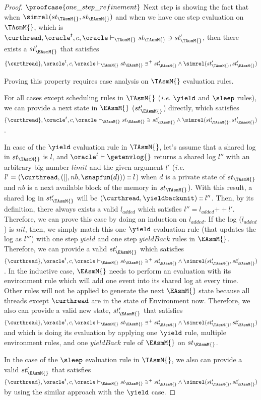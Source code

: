 \begin{proof}
$\proofcase{one\_step\_refinement}$
Next step is showing the fact that when $\simrel(st_{\TAsmM{}}, st_{\EAsmM{}})$ and 
when we have one step evaluation on $\TAsmM{}$, 
which is $\curthread, \oracle^{t}, c, \oracle \vdash_{\TAsmM{}} st_{\TAsmM{}} \ni st'_{\TAsmM{}} $, 
then there exists a $st'_{\EAsmM{}}$ that satisfies 
$$\{\curthread\}, \oracle^{t}, c, \oracle \vdash_{\TAsmM{}} st_{\EAsmM{}} \ni^{+} st'_{\EAsmM{}} \wedge \simrel(st'_{\TAsmM{}}, st'_{\EAsmM{}})$$

Proving this property requires case analysis on $\TAsmM{}$ evaluation rules.

For all cases except scheduling rules in $\TAsmM{}$ (\textit{i.e.} $\yield$ and $\sleep$ rules), 
we can provide a next state in $\EAsmM{}$ ($st'_{\EAsmM{}}$) directly, which satisfies $\{\curthread\}, \oracle^{t}, c,\oracle \vdash_{\EAsmM{}} st_{\EAsmM{}} \ni st'_{\EAsmM{}} \wedge \simrel(st'_{\TAsmM{}}, st'_{\EAsmM{}})$.

In case of the $\yield$ evaluation rule in $\TAsmM{}$, let's assume that 
a shared log in $st_{\TAsmM{}}$ is $l$, and $\oracle^{t} \vdash \getenvlog{}$ returns a shared log $l''$ with an arbitrary big number $limit$ and the 
given argument $l'$ (\textit{i.e.} $l' = (\curthread , ([], nb, \snapfun(d)))::l$) when $d$ is a 
private state of $st_{\TAsmM{}}$ and $nb$ is a next available block of the memory in $st_{\TAsmM{}}$). 
With this result, a shared log in $st'_{\TAsmM{}}$ will be $(\curthread , \yieldbackunit)::l''$.
Then, by its definition, there always exists a valid $l_{added}$ which satisfies $l'' = l_{added} {+\!\!+} l'$.
Therefore, we can prove this case by doing an induction on $l_{added}$. 
If the log ($l_{added}$) is $nil$, then, we simply match this one $\yield$ evaluation rule 
(that updates the log as $l'''$) with one step $yield$ and one step $yieldBack$ rules in $\EAsmM{}$.
Therefore, we can provide a valid $st'_{\EAsmM{}}$ 
which satisfies $\{\curthread\}, \oracle^{t}, c,\oracle \vdash_{\EAsmM{}} st_{\EAsmM{}} \ni^{+} st'_{\EAsmM{}} \wedge \simrel(st'_{\TAsmM{}}, st'_{\EAsmM{}})$.
In the inductive case, $\EAsmM{}$ needs to perform an evaluation with its environment rule which will add one event 
into its shared log at every time. 
Other rules will not be applied to generate the next $\EAsmM{}$ state because all threads except
$\curthread$ are in the state of $\mathrm{Environment}$ now. 
Therefore, we also can provide a valid new state, $st'_{\EAsmM{}}$ that satisfies 
$\{\curthread\}, \oracle^{t}, c,\oracle \vdash_{\EAsmM{}} st_{\EAsmM{}} \ni^{+} st'_{\EAsmM{}} \wedge \simrel(st'_{\TAsmM{}}, st'_{\EAsmM{}})$ and which is doing its evaluation by applying one $\yield$ rule, multiple environment 
rules, and one $yieldBack$ rule of $\EAsmM{}$ on $st_{\EAsmM{}}$.

In the case of the $\sleep$ evaluation rule in $\TAsmM{}$, we also can provide a valid $st'_{\EAsmM{}}$ that satisfies 
$\{\curthread\}, \oracle^{t}, c, \oracle\vdash_{\EAsmM{}} st_{\EAsmM{}} \ni^{+} st'_{\EAsmM{}} \wedge \simrel(st'_{\TAsmM{}}, st'_{\EAsmM{}})$ by using the similar approach with the $\yield$ case.
\end{proof}


